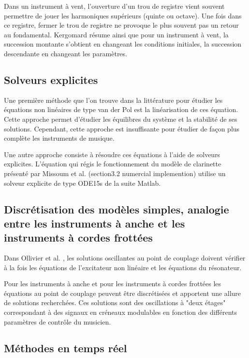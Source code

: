 \documentclass[atiam, article]{rapport} %
\begin{document}
Dans un instrument à vent, l'ouverture d'un trou de registre vient souvent permettre de jouer les harmoniques supérieurs (quinte ou octave). Une fois dans ce registre, fermer le trou de registre ne provoque le plus souvent pas un retour au fondamental.
Kergomard résume ainsi que pour un instrument à vent, \og la succession montante s’obtient en changeant les conditions initiales, la succession descendante en changeant les paramètres\fg \cite{kergomard_instruments_1997}.

\subsection{Solveurs explicites} \label{sec:solveurs}

Une première méthode que l'on trouve dans la littérature pour étudier les équations non linéaires de type van der Pol est la linéarisation de ces équation. Cette approche permet d'étudier les équilibres du système et la stabilité de ses solutions. Cependant, cette approche est insuffisante pour étudier de façon plus complète les instruments de musique. 

Une autre approche consiste à résoudre ces équations à l'aide de solveurs explicites. L'équation qui régis le fonctionnement du modèle de clarinette présenté par Missoum et al. \cite{missoum_explicit_2014} (section3.2 numercial implemention) utilise un solveur explicite de type ODE15s de la suite Matlab. 

\subsection{Discrétisation des modèles simples, analogie entre les instruments à anche et les instruments à cordes frottées}

Dans Ollivier et al. \cite{ollivier_idealized_2004}, les solutions oscillantes au point de couplage doivent vérifier à la fois les équations de l'excitateur non linéaire et les équations du résonateur. 

Pour les instruments à anche et pour les instruments à cordes frottées les équations au point de couplage peuvent être discrétisées et apportent une allure de solutions recherchées. Ces solutions sont des oscillations à "deux étages" correspondant à des signaux en créneaux modulables en fonction des différents paramètres de contrôle du musicien.


\subsection{Méthodes en temps réel}
\end{document}
